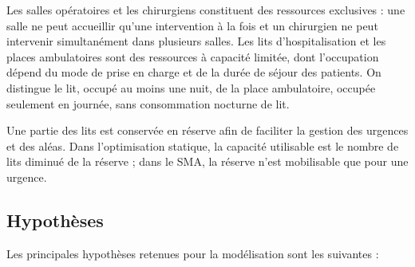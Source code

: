 \documentclass[11pt,a4paper]{article}
\begin{document}
Les salles opératoires et les chirurgiens constituent des ressources exclusives : une salle ne peut accueillir qu'une intervention à la fois et un chirurgien ne peut intervenir simultanément dans plusieurs salles. Les lits d'hospitalisation et les places ambulatoires sont des ressources à capacité limitée, dont l'occupation dépend du mode de prise en charge et de la durée de séjour des patients. On distingue le lit, occupé au moins une nuit, de la place ambulatoire, occupée seulement en journée, sans consommation nocturne de lit.

Une partie des lits est conservée en réserve afin de faciliter la gestion des urgences et des aléas. Dans l'optimisation statique, la capacité utilisable est le nombre de lits diminué de la réserve ; dans le SMA, la réserve n'est mobilisable que pour une urgence.




\subsection{Hypothèses}

Les principales hypothèses retenues pour la modélisation sont les suivantes :
\end{document}
